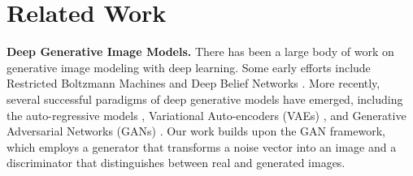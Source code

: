 \documentclass[10pt,twocolumn,letterpaper]{article}
\newcommand{\vpara}[1]{\vspace{0.1in}\noindent\textbf{#1}}
\begin{document}
\section{Related Work}
\label{related}
\vspace{-0.1in}
\vpara{Deep Generative Image Models.}
There has been a large body of work on generative image modeling with deep learning. Some early efforts include Restricted Boltzmann Machines \cite{hinton2002training} and Deep Belief Networks \cite{hinton2006reducing}.
More recently, several successful paradigms of deep generative models have emerged, including the auto-regressive models \cite{larochelle2011neural,germain2015made,theis2015generative,oord2016pixel,oord2016conditional,gregor2014deep}, Variational Auto-encoders (VAEs) \cite{kingma2014auto,kingma2014semi,rezende2014stochastic,yan2016attribute2image,gregor2015draw}, and Generative Adversarial Networks (GANs) \cite{goodfellow2014generative, denton2015deep, radford2016unsupervised, reed2016generative,salimans2016improved,larsen2016autoencoding}. Our work builds upon the GAN framework, which employs a generator that transforms a noise vector into an image and a discriminator that distinguishes between real and generated images.
\end{document}
